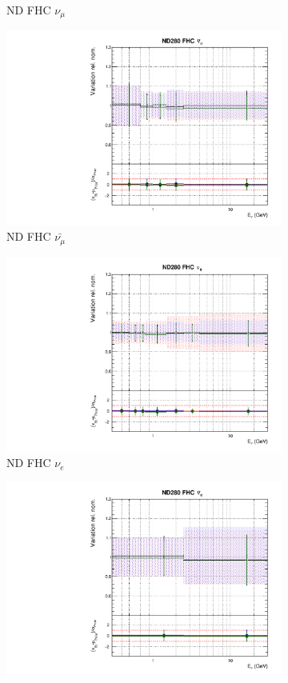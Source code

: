 \begin{figure}[!htbp]
\begin{subfigure}{0.45\textwidth}
  \caption{ND FHC $\nu_{\mu}$}
\end{subfigure}
\begin{subfigure}{0.45\textwidth}
  \centering
  \includegraphics[width=0.75\linewidth]{figs/polyasmvsflux_1}
  \caption{ND FHC $\bar{\nu_{\mu}}$}
\end{subfigure}
\begin{subfigure}{0.45\textwidth}
  \centering
  \includegraphics[width=0.75\linewidth]{figs/polyasmvsflux_2}
  \caption{ND FHC $\nu_{e}$}
\end{subfigure}
\begin{subfigure}{0.45\textwidth}
  \centering
  \includegraphics[width=0.75\linewidth]{figs/polyasmvsflux_3}

\end{subfigure}
\end{figure}
